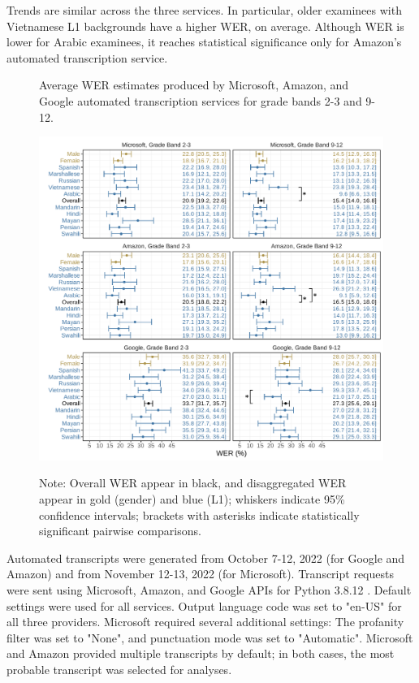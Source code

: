 \documentclass [PhD] {uclathes}
\begin{document}
Trends are similar across the three services. In particular, older examinees with Vietnamese L1 backgrounds have a higher WER, on average. Although WER is lower for Arabic examinees, it reaches statistical significance only for Amazon's automated transcription service. 

\begin{figure}[h]
    \centering
    \caption{Average WER estimates produced by Microsoft, Amazon, and Google automated transcription services for grade bands 2-3 and 9-12.}
    \includegraphics[width=6.5in]{figures/20230513_adj_werPlot_sigBars.pdf}
    \label{fig:wer_all}
\caption*{\small Note: Overall WER appear in black, and disaggregated WER appear in gold (gender) and blue (L1); whiskers indicate 95\% confidence intervals; brackets with asterisks indicate statistically significant pairwise comparisons.}
\end{figure}

Automated transcripts were generated from October 7-12, 2022 (for Google and Amazon) and from November 12-13, 2022 (for Microsoft). Transcript requests were sent using Microsoft, Amazon, and Google APIs for Python 3.8.12 \citep{python2022}. Default settings were used for all services. Output language code was set to "en-US" for all three providers. Microsoft required several additional settings: The profanity filter was set to "None", and punctuation mode was set to "Automatic". Microsoft and Amazon provided multiple transcripts by default; in both cases, the most probable transcript was selected for analyses. 
\end{document}
